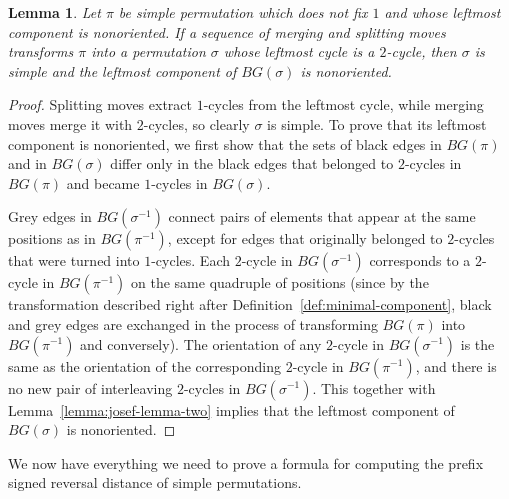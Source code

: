 \documentclass[review]{elsarticle}
\newtheorem{lemma}{Lemma}
\begin{document}
\begin{lemma}\label{lemma:josef-lemma-three}
Let $\pi$ be simple permutation which does not fix $1$ and whose leftmost component is nonoriented. If a sequence of merging and splitting moves transforms $\pi$ into a permutation $\sigma$ whose leftmost cycle is a $2$-cycle, then $\sigma$ is simple and the leftmost component of $BG(\sigma)$ is nonoriented.
\end{lemma}
\begin{proof}
Splitting moves extract $1$-cycles from the leftmost cycle, while merging moves merge it with $2$-cycles, so clearly $\sigma$ is simple. To prove that its leftmost component is nonoriented, we first show that the sets of black edges in $BG(\pi)$ and in $BG(\sigma)$ differ only in the black edges that belonged to $2$-cycles in $BG(\pi)$ and became $1$-cycles in $BG(\sigma)$. 

Grey edges in $BG(\sigma^{-1})$ connect pairs of elements that appear at the same positions as in $BG(\pi^{-1})$, except for edges that originally belonged to $2$-cycles that were turned into $1$-cycles. Each $2$-cycle in $BG(\sigma^{-1})$ corresponds to a $2$-cycle in $BG(\pi^{-1})$ on the same quadruple of positions (since by the transformation described right after Definition~\ref{def:minimal-component}, black and grey edges are exchanged in the process of transforming $BG(\pi)$ into $BG(\pi^{-1})$ and conversely). The orientation of any $2$-cycle in $BG(\sigma^{-1})$ is the same as the orientation of the corresponding $2$-cycle in $BG(\pi^{-1})$, and there is no new pair of interleaving $2$-cycles in $BG(\sigma^{-1})$. This together with Lemma~\ref{lemma:josef-lemma-two} implies that the leftmost component of $BG(\sigma)$ is nonoriented.
\end{proof}

We now have everything we need to prove a formula for computing the prefix signed reversal distance of simple permutations.
\end{document}
